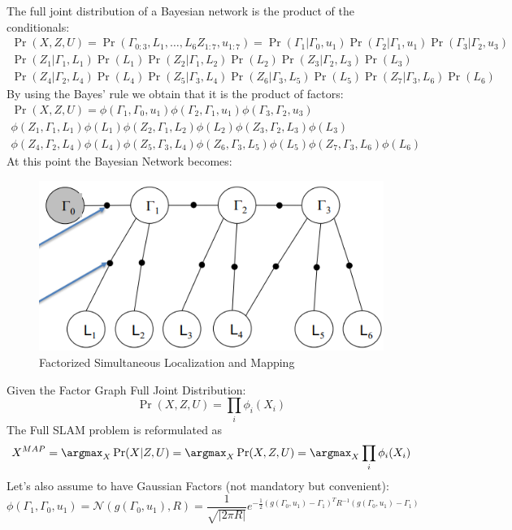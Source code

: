 The full joint distribution of a Bayesian network is the product of the conditionals: 
\begin{multline*}
    \Pr(X,Z,U)=\Pr(\Gamma_{0:3},L_1,\ldots,L_6 Z_{1:7},u_{1:7})= 
    \Pr(\Gamma_1|\Gamma_0,u_{1})
    \Pr(\Gamma_2|\Gamma_1,u_{1})
    \Pr(\Gamma_3|\Gamma_2,u_{3}) \\
    \Pr(Z_1|\Gamma_1,L_1)
    \Pr(L_1)
    \Pr(Z_2|\Gamma_1,L_2)
    \Pr(L_2)
    \Pr(Z_3|\Gamma_2,L_3)
    \Pr(L_3) \\
    \Pr(Z_4|\Gamma_2,L_4)
    \Pr(L_4)
    \Pr(Z_5|\Gamma_3,L_4)
    \Pr(Z_6|\Gamma_3,L_5)
    \Pr(L_5)
    \Pr(Z_7|\Gamma_3,L_6)
    \Pr(L_6)
\end{multline*}
By using the Bayes' rule we obtain that it is the product of factors: 
\begin{multline*}
    \Pr(X,Z,U)=
    \phi(\Gamma_1,\Gamma_0,u_{1})
    \phi(\Gamma_2,\Gamma_1,u_{1})
    \phi(\Gamma_3,\Gamma_2,u_{3}) \\
    \phi(Z_1,\Gamma_1,L_1)
    \phi(L_1)
    \phi(Z_2,\Gamma_1,L_2)
    \phi(L_2)
    \phi(Z_3,\Gamma_2,L_3)
    \phi(L_3) \\
    \phi(Z_4,\Gamma_2,L_4)
    \phi(L_4)
    \phi(Z_5,\Gamma_3,L_4)
    \phi(Z_6,\Gamma_3,L_5)
    \phi(L_5)
    \phi(Z_7,\Gamma_3,L_6)
    \phi(L_6)
\end{multline*}
At this point the Bayesian Network becomes: 
\begin{figure}[H]
    \centering
    \includegraphics[width=0.75\linewidth]{images/facslam.png}
    \caption{Factorized Simultaneous Localization and Mapping}
\end{figure}
Given the Factor Graph Full Joint Distribution: 
\[\Pr(X,Z,U)=\prod_i\phi_i(X_i)\]
The Full SLAM problem is reformulated as
\[X^{MAP}=\argmax_X\Pr(X|Z,U)=\argmax_X\Pr(X,Z,U)=\argmax_X\prod_i\phi_i(X_i)\]
Let's also assume to have Gaussian Factors (not mandatory but convenient): 
\[\phi(\Gamma_1, \Gamma_0, u_1)= \mathcal{N}(g(\Gamma_0,u_1),R) =\dfrac{1}{\sqrt{\left\lvert 2\pi R\right\rvert}}e^{-\frac{1}{2}(g(\Gamma_0,u_1)-\Gamma_1)^TR^{-1}(g(\Gamma_0,u_1)-\Gamma_1)}\]
